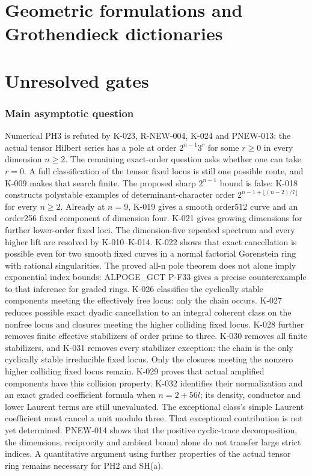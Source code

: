 \documentclass[11pt]{article}
\theoremstyle{definition}\newtheorem{definition}[theorem]{Definition}
\theoremstyle{remark}\newtheorem{remark}[theorem]{Remark}
\begin{document}
\part{Geometric formulations and Grothendieck dictionaries}


\part{Unresolved gates}
\section{Main asymptotic question}
Numerical PH3 is refuted by K-023, R-NEW-004, K-024 and PNEW-013:
the actual tensor Hilbert series has a pole at order $2^{n-1}3^r$
for some $r\ge0$ in every dimension $n\ge2$. The remaining exact-order
question asks whether one can take $r=0$. A full classification of
the tensor fixed locus is still one possible route, and K-009 makes
that search finite. The proposed sharp $2^{n-1}$ bound is false:
K-018 constructs polystable examples of determinant-character order
$2^{n-1+\lfloor(n-2)/7\rfloor}$ for every $n\ge2$.
Already at $n=9$, K-019 gives a smooth order512 curve and an
order256 fixed component of dimension four. K-021 gives growing
dimensions for further lower-order fixed loci. The dimension-five
repeated spectrum and every higher lift are resolved by K-010--K-014.
K-022 shows that exact cancellation is possible even for two smooth
fixed curves in a normal factorial Gorenstein ring with rational
singularities. The proved all-n pole theorem does not alone imply
exponential index bounds: ALPOGE\_GCT P-F33 gives a precise
counterexample to that inference for graded rings. K-026 classifies
the cyclically stable components meeting the effectively free locus:
only the chain occurs. K-027 reduces possible exact dyadic cancellation
to an integral coherent class on the nonfree locus and closures meeting
the higher colliding fixed locus. K-028 further removes finite
effective stabilizers of order prime to three. K-030 removes all finite
stabilizers, and K-031 removes every stabilizer exception: the chain is
the only cyclically stable irreducible fixed locus. Only the closures
meeting the nonzero higher colliding fixed locus remain. K-029 proves
that actual amplified components have this collision property.
K-032 identifies their normalization and an exact graded coefficient
formula when $n=2+56l$; its density, conductor and lower Laurent
terms are still unevaluated.
The exceptional class's simple Laurent coefficient must
cancel a unit modulo three. That exceptional contribution is not yet
determined. PNEW-014 shows that the positive cyclic-trace decomposition,
the dimensions, reciprocity and ambient bound alone do not transfer
large strict indices. A quantitative argument using further properties
of the actual tensor ring remains necessary for PH2 and SH(a).
\end{document}
